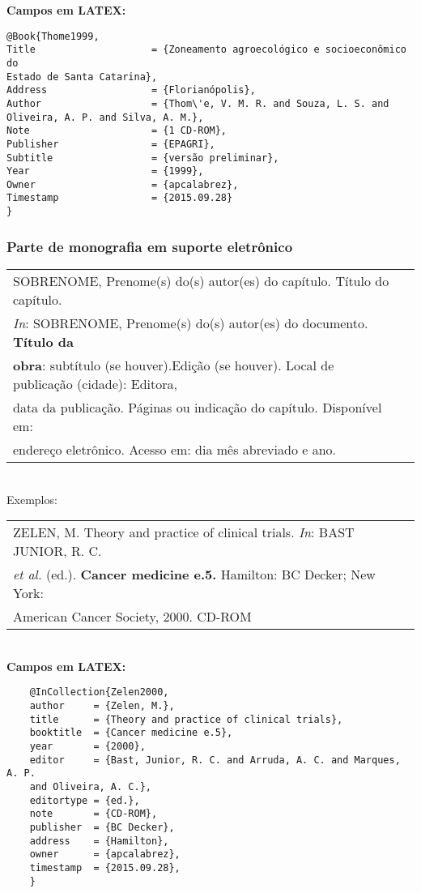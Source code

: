 \textbf{Campos em LATEX:} 

\begin{verbatim}
@Book{Thome1999,
Title                    = {Zoneamento agroecológico e socioeconômico do 
Estado de Santa Catarina},
Address                  = {Florianópolis},
Author                   = {Thom\'e, V. M. R. and Souza, L. S. and 
Oliveira, A. P. and Silva, A. M.},
Note                     = {1 CD-ROM},
Publisher                = {EPAGRI},
Subtitle                 = {versão preliminar},
Year                     = {1999},
Owner                    = {apcalabrez},
Timestamp                = {2015.09.28}
}
\end{verbatim}


 \subsubsection{Parte de monografia em suporte eletrônico}
	 
	 \begin{tabular}{|l|c|} \hline
	 	SOBRENOME, Prenome(s) do(s) autor(es) do capítulo. Título do capítulo. \\ \textit{In}:
	 	SOBRENOME, Prenome(s)  do(s) autor(es) do documento.  \textbf{Título da} \\ \textbf{obra}: subtítulo (se houver).Edição (se houver). Local de publicação (cidade): Editora, \\ data da publicação. Páginas ou indicação do capítulo. Disponível em: \\ endereço eletrônico. Acesso em: dia mês abreviado e ano.  \\\hline
	 \end{tabular} \\ 
	 
	 Exemplos: \\ 
	 
	 \begin{tabular}{|l|c|} \hline
		ZELEN, M. Theory and practice of clinical trials. \textit{In}: BAST JUNIOR, R. C. \\\textit{et al.} (ed.). \textbf{Cancer medicine e.5.} Hamilton: BC Decker; New York: \\American Cancer Society, 2000. CD-ROM  \\\hline
	\end{tabular} \\ 
	
	\textbf{Campos em LATEX:} 
	
	
	\begin{verbatim}
	@InCollection{Zelen2000,
	author     = {Zelen, M.},
	title      = {Theory and practice of clinical trials},
	booktitle  = {Cancer medicine e.5},
	year       = {2000},
	editor     = {Bast, Junior, R. C. and Arruda, A. C. and Marques, A. P. 
	and Oliveira, A. C.},
	editortype = {ed.},
	note       = {CD-ROM},
	publisher  = {BC Decker},
	address    = {Hamilton},
	owner      = {apcalabrez},
	timestamp  = {2015.09.28},
	}
	\end{verbatim}
		
